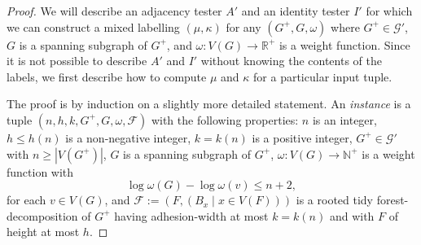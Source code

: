 \documentclass[twoside,leqno]{article}
\newcommand{\R}{\mathbb{R}}
\newcommand{\N}{\mathbb{N}}
\renewcommand{\le}{\leqslant}
\renewcommand{\geq}{\geqslant}
\newcommand{\defin}[1]{\emph{\textcolor{brightmaroon}{#1}}}
\begin{document}
\begin{proof}
  We will describe an adjacency tester $A'$ and an identity tester $I'$ for which we can construct a mixed labelling $(\mu,\kappa)$ for any $(G^+,G,\omega)$ where $G^+\in\mathcal{G}'$, $G$ is a spanning subgraph of $G^+$, and $\omega:V(G)\to\R^+$ is a weight function.
  Since it is not possible to describe $A'$ and $I'$ without knowing the contents of the labels, we first describe how to compute $\mu$ and $\kappa$ for a particular input tuple.

  The proof is by induction on a slightly more detailed statement. An \defin{instance} is a tuple $(n,h,k,G^+,G,\omega,\mathcal{F})$ with the following properties:
  $n$ is an integer,
  $h\le h(n)$ is a non-negative integer,
  $k=k(n)$ is a positive integer,
  $G^+\in\mathcal{G}'$ with $n\geq |V(G^+)|$,
  $G$ is a spanning subgraph of $G^+$,
  $\omega:V(G)\to\N^+$
  is a weight function with
  \begin{equation}
    \log\omega(G)-\log \omega(v)\le n+2,
    \label{eq:short-td-nice-weights}
  \end{equation}
  for each $v\in V(G)$, and
  $\mathcal{F}:=(F,(B_x \mid x\in V(F)))$ is a rooted tidy forest-decomposition of $G^+$ having adhesion-width at most $k=k(n)$ and with $F$ of height at most $h$.


\end{proof}
\end{document}
